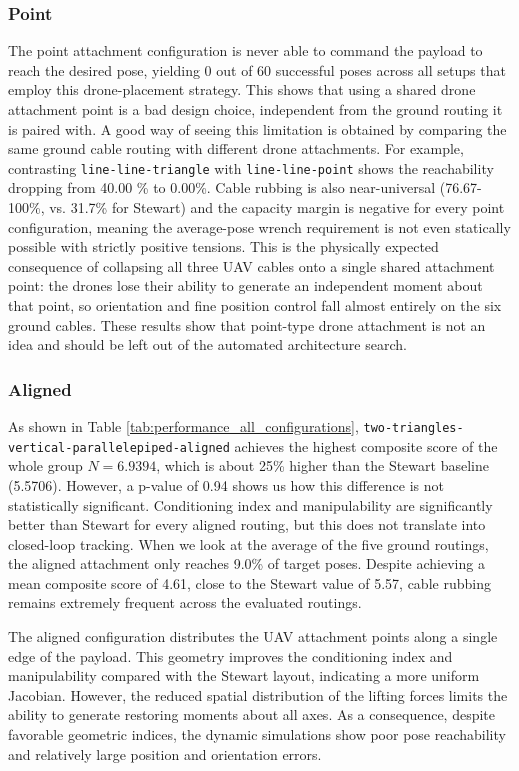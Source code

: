 \subsubsection{Point}
The point attachment configuration is never able to command the payload to reach the desired pose, yielding 0 out of 60 successful poses across all setups that employ this drone-placement strategy. This shows that using a shared drone attachment point is a bad design choice, independent from the ground routing it is paired with.
A good way of seeing this limitation is obtained by comparing the same ground cable routing with different drone attachments. For example, contrasting \texttt{line-line-triangle} with \texttt{line-line-point} shows the reachability dropping from 40.00 \% to 0.00\%. Cable rubbing is also near-universal (76.67-100\%, vs. 31.7\% for Stewart) and the capacity margin is negative for every point configuration, meaning the average-pose wrench requirement is not even statically possible with strictly positive tensions.
This is the physically expected consequence of collapsing all three UAV cables onto a single shared attachment point: the drones lose their ability to generate an independent moment about that point, so orientation and fine position control fall almost entirely on the six ground cables. These results show that point-type drone attachment is not an idea and should be left out of the automated architecture search.

\subsubsection{Aligned}
As shown in Table \ref{tab:performance_all_configurations}, \texttt{two-triangles-vertical-parallelepiped-aligned} achieves the highest composite score of the whole group $N=6.9394$, which is about 25\% higher than the Stewart baseline (5.5706). However, a p-value of 0.94 shows us how this difference is not statistically significant. Conditioning index and manipulability are significantly better than Stewart for every aligned routing, but this does not translate into closed-loop tracking. When we look at the average of the five ground routings, the aligned attachment only reaches 9.0\% of target poses. Despite achieving a mean composite score of 4.61, close to the Stewart value of 5.57, cable rubbing remains extremely frequent across the evaluated routings.

The aligned configuration distributes the UAV attachment points along a single edge of the payload. This geometry improves the conditioning index and manipulability compared with the Stewart layout, indicating a more uniform Jacobian. However, the reduced spatial distribution of the lifting forces limits the ability to generate restoring moments about all axes. As a consequence, despite favorable geometric indices, the dynamic simulations show poor pose reachability and relatively large position and orientation errors.

